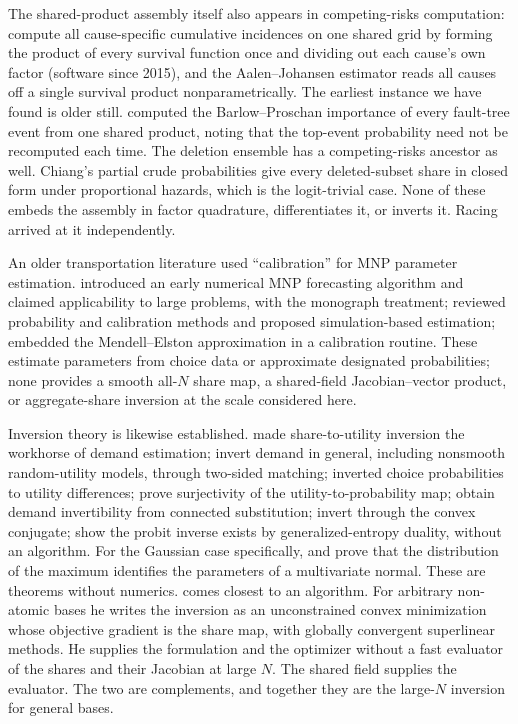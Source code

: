 \documentclass[12pt]{article}
\theoremstyle{remark}
\begin{document}
The shared-product assembly itself also appears in competing-risks
computation: \citet{mahani2019} compute all cause-specific cumulative
incidences on one shared grid by forming the product of every survival
function once and dividing out each cause's own factor (software since
2015), and the Aalen--Johansen estimator \citep{aalen1978} reads all
causes off a single survival product nonparametrically. The earliest
instance we have found is older still. \citet{lambert1975} computed the
Barlow--Proschan importance of every fault-tree event from one shared
product, noting that the top-event probability need not be recomputed
each time. The deletion ensemble has a competing-risks ancestor as
well. Chiang's partial crude probabilities \citep{chiang1961} give
every deleted-subset share in closed form under proportional hazards,
which is the logit-trivial case. None of these embeds the assembly in
factor quadrature, differentiates it, or inverts it. Racing arrived at
it independently.

An older transportation literature used ``calibration'' for MNP
parameter estimation. \citet{daganzo1977} introduced an early numerical
MNP forecasting algorithm and claimed applicability to large problems,
with \citet{daganzo1979} the monograph treatment;
\citet{sheffi1982} reviewed probability and calibration methods and
proposed simulation-based estimation; \citet{kamakura1989} embedded the
Mendell--Elston approximation in a calibration routine. These estimate
parameters from choice data or approximate designated probabilities;
none provides a smooth all-$N$ share map, a shared-field
Jacobian--vector product, or aggregate-share inversion at the scale
considered here.

Inversion theory is likewise established. \citet{berry1994} made
share-to-utility inversion the workhorse of demand estimation;
\citet{bonnet2022} invert demand in general, including nonsmooth
random-utility models, through two-sided matching;
\citet{hotz1993}
inverted choice probabilities to utility differences; \citet{norets2013}
prove surjectivity of the utility-to-probability map;
\citet{bgh2013} obtain demand invertibility from
connected substitution;
\citet{chiong2016} invert through the convex
conjugate; \citet{fosgerau2020} show the probit inverse exists by
generalized-entropy duality, without an algorithm. For the Gaussian
case specifically, \citet{andersonghurye1977} and \citet{mukherjea1990}
prove that the distribution of the maximum identifies the parameters of
a multivariate normal. These are theorems without numerics.
\citet{li2018} comes closest to an algorithm. For arbitrary non-atomic
bases he writes the inversion as an unconstrained convex minimization
whose objective gradient is the share map, with globally convergent
superlinear methods. He supplies the formulation and the optimizer
without a fast evaluator of the shares and their Jacobian at large $N$.
The shared field supplies the evaluator. The two are complements, and
together they are the large-$N$ inversion for general bases.
\end{document}
